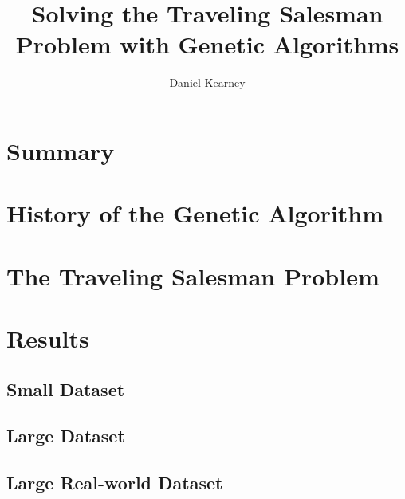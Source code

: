 \documentclass[UTF8]{report}
\begin{document}
\title{%
  Solving the Traveling Salesman Problem with Genetic Algorithms 
}

\author{Daniel Kearney}

\maketitle

\tableofcontents
\pagebreak

\section{Summary}

\section{History of the Genetic Algorithm}

\section{The Traveling Salesman Problem}







\section{Results}

\subsection{Small Dataset}

\subsection{Large Dataset}

\subsection{Large Real-world Dataset}
\end{document}
